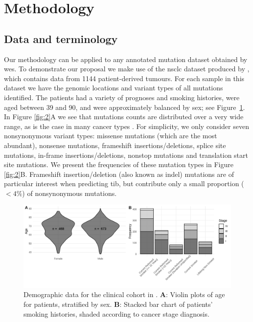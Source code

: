 \documentclass[12pt]{article}
\begin{document}



\section{Methodology}
\label{sec:methodology}
\subsection{Data and terminology \label{sec:dataterminology}}
Our methodology can be applied to any annotated mutation dataset obtained by \acrshort{wes}. 
To demonstrate our proposal we make use of the \acrshort{nsclc} dataset produced by \citet{campbell_distinct_2016}, which contains data from 1144 patient-derived tumours.  For each sample in this dataset we have the genomic locations and variant types of all mutations identified.  The patients had a variety of prognoses and smoking histories, were aged between 39 and 90, and were approximately balanced by sex; see Figure~\ref{fig:1}. In Figure \ref{fig:2}A we see that mutations counts are distributed over a very wide range, as is the case in many cancer types \citep{chalmers_analysis_2017}. For simplicity, we only consider seven nonsynonymous variant types: missense mutations (which are the most abundant), nonsense mutations, frameshift insertions/deletions, splice site mutations, in-frame insertions/deletions, nonstop mutations and translation start site mutations.  We present the frequencies of these mutation types in Figure \ref{fig:2}B. Frameshift insertion/deletion (also known as indel) mutations are of particular interest when predicting \acrshort{tib}, but contribute only a small proportion ($<4\%$) of nonsynonymous mutations. 

\begin{figure}[htbp]
\centering
\includegraphics[width=6in]{figures/fig1.png}
\vspace*{-5mm}
\caption{Demographic data for the clinical cohort in \citet{campbell_distinct_2016}. \textbf{A}: Violin plots of age for patients, stratified by sex. \textbf{B}: Stacked bar chart of patients' smoking histories, shaded according to cancer stage diagnosis. \label{fig:1}}
\vspace*{-2mm}
\end{figure}
\end{document}
